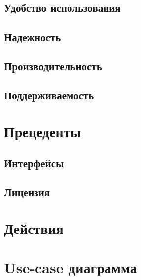 \documentclass{article}
\begin{document}
\subsection{Удобство использования}


\subsection{Надежность}


\subsection{Производительность}


\subsection{Поддерживаемость}


\section{Прецеденты}
\subsection{Интерфейсы}


\subsection{Лицензия}


\section{Действия}


\newpage
\section{Use-case диаграмма}
\end{document}
